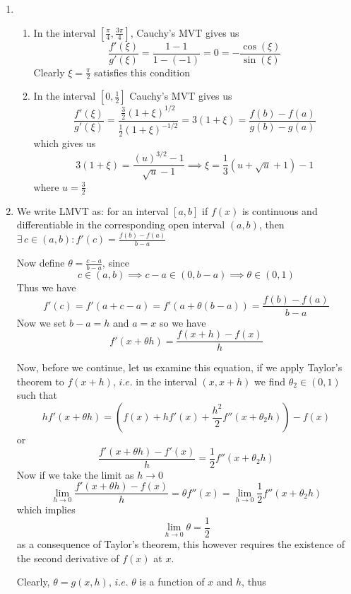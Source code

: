 \documentclass[12pt]{article}
\begin{document}
\begin{enumerate}
\begin{enumerate}
		\end{enumerate}
	\item
		\begin{enumerate}

			\item
				In the interval $\left[ \frac{\pi}{4}, \frac{3\pi}{4} \right]$, Cauchy's MVT gives us
				$$
				\frac{f'(\xi)}{g'(\xi)} = \frac{1-1}{1-(-1)} = 0 = -\frac{\cos(\xi)}{\sin(\xi)}
				$$
				Clearly $\xi = \frac{\pi}{2}$ satisfies this condition

			\item
				In the interval $\left[ 0,  \frac{1}{2} \right]$ Cauchy's MVT gives us
				$$
				\frac{f'(\xi)}{g'(\xi)} = \frac{\frac{3}{2}(1+\xi)^{1/2}}{\frac{1}{2}(1+\xi)^{-1/2}} = 3(1+\xi) = \frac{f(b)-f(a)}{g(b) -g(a)} 
				$$
				which gives us
				$$
				3(1+\xi) = \frac{\left( u \right)^{3/2}-1}{\sqrt{ u }-1} \implies \xi = \frac{1}{3} (u + \sqrt{ u } + 1)-1
				$$
				where $u = \frac{3}{2}$

		\end{enumerate}
	\item
		We write LMVT as: for an interval $[a,b]$ if $f(x)$ is continuous and differentiable in the corresponding open interval $(a,b)$, then $\exists \, c \in (a,b) : f'(c) = \frac{f(b)-f(a)}{b-a}$

		Now define $\theta = \frac{c-a}{b-a}$, since 
		$$
		c \in(a,b) \implies c-a \in(0,b-a) \implies \theta \in(0,1)
		$$
		Thus we have
		$$
		\boxed{
			f'(c) = f'(a + c-a) = f'(a + \theta(b-a)) = \frac{f(b)-f(a)}{b-a}
		}
		$$
		Now we set $b-a = h$ and $a = x$ so we have
		$$
		f'(x + \theta h) = \frac{f(x + h)-f(x)}{h}
		$$

		Now, before we continue, let us examine this equation, if we apply Taylor's theorem to $f(x +h)$, $i$.$e$. in the interval $(x,x+h)$ we find $\theta_{2} \in (0,1)$ such that
		$$
		hf'(x + \theta h) = \left( f(x) + hf'(x) + \frac{h^{2}}{2}f''(x + \theta_{2}h) \right)-f(x)
		$$
		or
		$$
		\frac{f'(x + \theta h)-f'(x)}{h} =\frac{1}{2}f''(x +\theta_{2}h)
		$$
		Now if we take the limit as $h \to 0$
		$$
		\lim_{ h \to 0 } \frac{f'(x + \theta h)-f(x)}{h} = \theta f''(x) = \lim_{  h \to 0 } \frac{1}{2}f''(x + \theta_{2}h)
		$$
		which implies
		$$
		\lim_{ h \to 0 } \theta = \frac{1}{2}
		$$
		as a consequence of Taylor's theorem, this however requires the existence of the second derivative of $f(x)$ at $x$.

		Clearly, $\theta = g(x,h)$, $i$.$e$. $\theta$ is a function of $x$ and $h$, thus


\end{enumerate}
\end{document}
